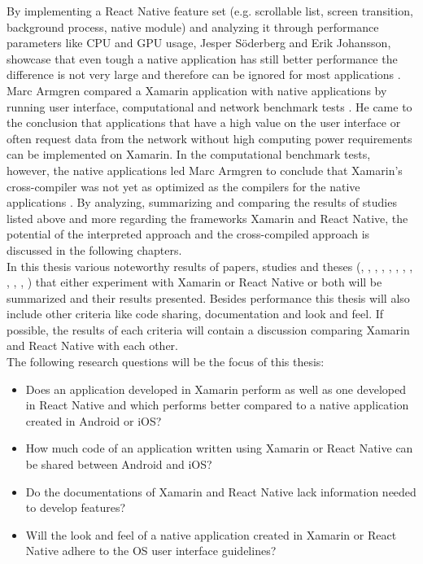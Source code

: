 \documentclass[Bachelor,BIF,english]{twbook}
\begin{document}
By implementing a React Native feature set (e.g. scrollable list, screen transition, background process, native module) and analyzing it through performance parameters like CPU and GPU usage, Jesper Söderberg and Erik Johansson, showcase that even tough a native application has still better performance the difference is not very large and therefore can be ignored for most applications \cite{JohanssonSderberg2018}. Marc Armgren compared a Xamarin application with native applications by running user interface, computational and network benchmark tests \cite{Armgren_2015}. He came to the conclusion that applications that have a high value on the user interface or often request data from the network without high computing power requirements can be implemented on Xamarin. In the computational benchmark tests, however, the native applications led Marc Armgren to conclude that Xamarin's cross-compiler was not yet as optimized as the compilers for the native applications \cite{Armgren_2015}. By analyzing, summarizing and comparing the results of studies listed above and more regarding the frameworks Xamarin and React Native, the potential of the interpreted approach and the cross-compiled approach is discussed in the following chapters.
\\[\baselineskip]
In this thesis various noteworthy results of papers, studies and theses (\cite{Danielsson_2016}, \cite{Axelsson2016}, \cite{Hansson_Vidhall_2016}, \cite{MartinezLecomte2018}, \cite{ZubaBernhard2017EdPb}, \cite{WillocxVossaertNaessens2015}, \cite{MartinezLecomte2017}, \cite{Dickson_2013}, \cite{GaouarBenamarBendimerad2016}, \cite{7479278}, \cite{LinckArne2016}, \cite{7934674}) that either experiment with Xamarin or React Native or both will be summarized and their results presented. Besides performance this thesis will also include other criteria like code sharing, documentation and look and feel. If possible, the results of each criteria will contain a discussion comparing Xamarin and React Native with each other. 
\\[\baselineskip]
The following research questions will be the focus of this thesis:
\begin{itemize}
\item Does an application developed in Xamarin perform as well as one developed in React Native and which performs better compared to a native application created in Android or iOS?
\item How much code of an application written using Xamarin or React Native can be shared between Android and iOS?
\item Do the documentations of Xamarin and React Native lack information needed to develop features?
\item Will the look and feel of a native application created in Xamarin or React Native adhere to the OS user interface guidelines?
\end{itemize}
\end{document}
